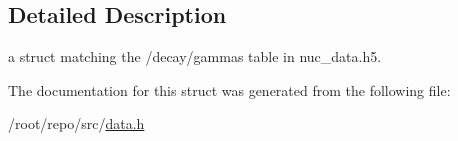 \subsection{Detailed Description}
a struct matching the \textquotesingle{}/decay/gammas\textquotesingle{} table in nuc\+\_\+data.\+h5. 

The documentation for this struct was generated from the following file\+:\begin{DoxyCompactItemize}
\item 
/root/repo/src/\hyperlink{data_8h}{data.\+h}\end{DoxyCompactItemize}

